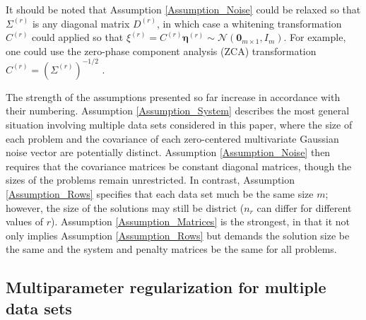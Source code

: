 \documentclass[12pt]{article}
\newcommand{\mA}{m}	%
\newcommand{\noise}{\eta}	%
\newcommand{\noiseVec}{\bm{\noise}}	%
\newcommand{\zeroVec}{\bm{0}}	%
\begin{document}
\noindent It should be noted that Assumption \ref{Assumption_Noise} could be relaxed so that $\Sigma^{(r)}$ is any diagonal matrix $D^{(r)}$, in which case a whitening transformation $C^{(r)}$ could applied so that $\xi^{(r)} = C^{(r)}\noiseVec^{(r)} \sim \mathcal{N}(\zeroVec_{\mA \times 1},I_{\mA})$. For example, one could use the zero-phase component analysis (ZCA) transformation $C^{(r)} = \left(\Sigma^{(r)}\right)^{-1/2}$ \cite{BellSejnowski}. \par
The strength of the assumptions presented so far increase in accordance with their numbering. Assumption \ref{Assumption_System} describes the most general situation involving multiple data sets considered in this paper, where the size of each problem and the covariance of each zero-centered multivariate Gaussian noise vector are potentially distinct. Assumption \ref{Assumption_Noise} then requires that the covariance matrices be constant diagonal matrices, though the sizes of the problems remain unrestricted. In contrast, Assumption \ref{Assumption_Rows} specifies that each data set much be the same size $m$; however, the size of the solutions may still be district ($n_r$ can differ for different values of $r$). Assumption \ref{Assumption_Matrices} is the strongest, in that it not only implies Assumption \ref{Assumption_Rows} but demands the solution size be the same and the system and penalty matrices be the same for all problems.

\subsection{Multiparameter regularization for multiple data sets} \label{sec:Adapted regularization}
\end{document}
